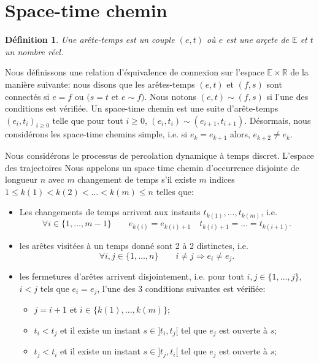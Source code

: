 \documentclass[titlepage,a4paper,12pt]{article}
\newcounter{def}
\newtheorem{pointTS}[def]{Définition}
\begin{document}
\section{Space-time chemin}

\begin{pointTS}
Une arête-temps est un couple $(e,t)$ où $e$ est une arçete de $\mathbb{E}$ et $t$ un nombre réel. 
\end{pointTS}

Nous définissons une relation d'équivalence de connexion sur l'espace $\mathbb{E}\times \mathbb{R}$ de la manière suivante: nous disons que les arêtes-temps $(e,t)$ et $(f,s)$ sont connectés si $e=f$ ou $(s=t$ et $e\sim f)$. Nous notons $(e,t)\sim(f,s)$ si l'une des conditions est vérifiée. Un space-time chemin est une suite d'arête-temps $(e_i,t_i)_{i\geqslant 0}$ telle que pour tout $i\geqslant 0$, $(e_i,t_i)\sim(e_{i+1},t_{i+1})$. Désormais, nous considérons les space-time chemins simple, i.e. si $e_k = e_{k+1}$ alors, $e_{k+2} \neq e_k$.

Nous considérons le processus de percolation dynamique à temps discret. L'espace des trajectoires 
Nous appelons un space time chemin d'occurrence disjointe de longueur $n$ avec $m$ changement de temps s'il existe $m$ indices $1\leqslant k(1)< k(2) < \dots < k(m) \leqslant n$ telles que:
\begin{itemize}[label = $\bullet$, leftmargin = *]
\item Les changements de temps arrivent aux instants $t_{k(1)},\dots, t_{k(m)}$, i.e.
$$\forall i\in \{1,\dots, m-1\} \qquad e_{k(i)} = e_{k(i)+1} \quad t_{k(i)+1} =\dots = t_{k(i+1)}.
$$
\item les arêtes visitées à un temps donné sont 2 à 2 distinctes, i.e.
$$ \forall i,j \in \{1,\dots, n\} \qquad i\neq j \Rightarrow e_i\neq e_j.
$$
\item les fermetures d'arêtes arrivent disjointement, i.e. pour tout $i,j\in \{1,\dots, j\}$, $i<j$ tels que $e_i = e_j$, l'une des 3 conditions suivantes est vérifiée:
\begin{itemize}
\item $j=i+1$ et $i\in \{k(1),\dots, k(m)\}$;
\item $t_i< t_j$ et il existe un instant $s\in ]t_i,t_j[$ tel que $e_j$ est ouverte à $s$;
\item $t_j< t_i$ et il existe un instant $s\in ]t_j,t_i[$ tel que $e_j$ est ouverte à $s$;
\end{itemize}
\end{itemize}
\end{document}
